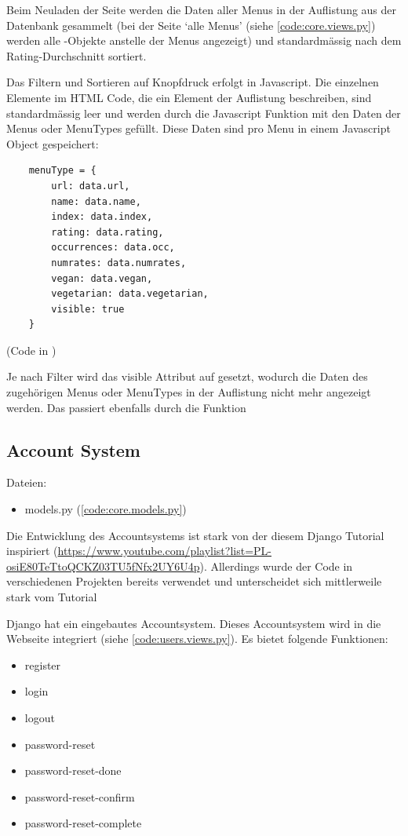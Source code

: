 Beim Neuladen der Seite werden die Daten aller Menus in der Auflistung aus der
Datenbank gesammelt (bei der Seite `alle Menus' (siehe \ref{code:core.views.py})
werden alle -Objekte anstelle der Menus angezeigt) und
standardmässig nach dem Rating-Durchschnitt sortiert. 

Das Filtern und Sortieren auf Knopfdruck erfolgt in Javascript. Die einzelnen
 Elemente im HTML Code, die ein Element der Auflistung beschreiben,
sind standardmässig leer und werden durch die Javascript Funktion
 mit den Daten der Menus oder MenuTypes gefüllt. Diese Daten sind pro
Menu in einem Javascript Object gespeichert:

\begin{lstlisting}
    menuType = {
        url: data.url,
        name: data.name,
        index: data.index,
        rating: data.rating,
        occurrences: data.occ,
        numrates: data.numrates,
        vegan: data.vegan,
        vegetarian: data.vegetarian,
        visible: true
    }
\end{lstlisting}

(Code in )

Je nach Filter wird das visible Attribut auf  gesetzt, wodurch die
Daten des zugehörigen Menus oder MenuTypes in der Auflistung nicht mehr
angezeigt werden. Das passiert ebenfalls durch die  Funktion

\newpage

\subsection{Account System} \label{spez:Account}

Dateien:
\begin{itemize}
    \item models.py (\ref{code:core.models.py})
\end{itemize}

Die Entwicklung des Accountsystems ist stark von der diesem Django Tutorial
inspiriert
(\url{https://www.youtube.com/playlist?list=PL-osiE80TeTtoQCKZ03TU5fNfx2UY6U4p}).
Allerdings wurde der Code in verschiedenen Projekten bereits verwendet und
unterscheidet sich mittlerweile stark vom Tutorial

Django hat ein eingebautes Accountsystem. Dieses Accountsystem wird in die
Webseite integriert (siehe \ref{code:users.views.py}). Es bietet folgende
Funktionen:
\begin{itemize}
    \item register
    \item login
    \item logout
    \item password-reset
    \item password-reset-done
    \item password-reset-confirm
    \item password-reset-complete
\end{itemize}


